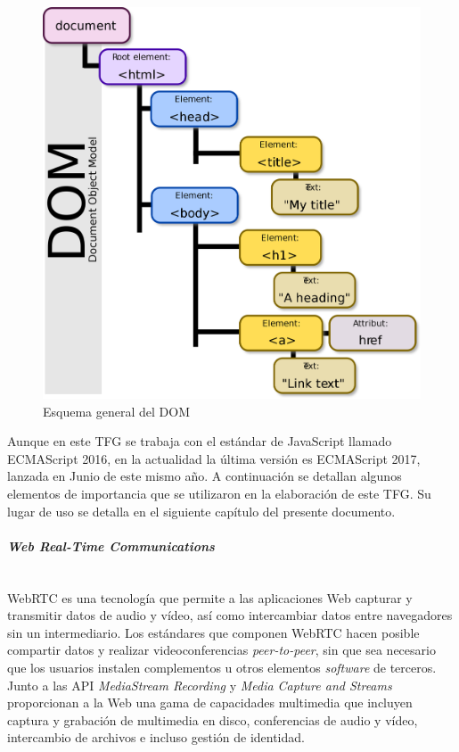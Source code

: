 \begin{figure}[!t]
\begin{center}
\includegraphics[width=0.75\linewidth]{./3_Tecnologias/Img/DOMModel.png}
\end{center}
\caption{Esquema general del DOM}
\label{DOMModel}
\end{figure}


Aunque en este TFG se trabaja con el estándar de JavaScript llamado ECMAScript 2016, en la actualidad la última versión es ECMAScript 2017, lanzada en Junio de este mismo año. A continuación se detallan algunos elementos de importancia que se utilizaron en la elaboración de este TFG. Su lugar de uso se detalla en el siguiente capítulo del presente documento.

\paragraph{\emph{Web Real-Time Communications}} ~\\

WebRTC es una tecnología que permite a las aplicaciones Web capturar y transmitir datos de audio y vídeo, así como intercambiar datos entre navegadores sin un intermediario. Los estándares que componen WebRTC hacen posible compartir datos y realizar videoconferencias \emph{peer-to-peer}, sin que sea necesario que los usuarios instalen complementos u otros elementos \emph{software} de terceros. Junto a las API \emph{MediaStream Recording} y \emph{Media Capture and Streams} proporcionan a la Web una gama de capacidades multimedia que incluyen captura y grabación de multimedia en disco, conferencias de audio y vídeo, intercambio de archivos e incluso gestión de identidad.

